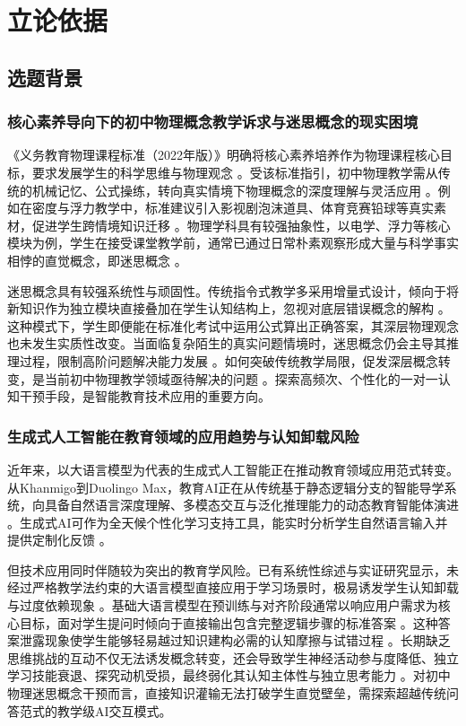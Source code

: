 \chapter{立论依据}
\label{chap:rationale}

\section{选题背景}

\subsection{核心素养导向下的初中物理概念教学诉求与迷思概念的现实困境}

《义务教育物理课程标准（2022年版）》明确将核心素养培养作为物理课程核心目标，要求发展学生的科学思维与物理观念 \citep{ref1}。受该标准指引，初中物理教学需从传统的机械记忆、公式操练，转向真实情境下物理概念的深度理解与灵活应用 \citep{ref3}。例如在密度与浮力教学中，标准建议引入影视剧泡沫道具、体育竞赛铅球等真实素材，促进学生跨情境知识迁移 \citep{ref1}。物理学科具有较强抽象性，以电学、浮力等核心模块为例，学生在接受课堂教学前，通常已通过日常朴素观察形成大量与科学事实相悖的直觉概念，即迷思概念 \citep{ref4}。

迷思概念具有较强系统性与顽固性。传统指令式教学多采用增量式设计，倾向于将新知识作为独立模块直接叠加在学生认知结构上，忽视对底层错误概念的解构 \citep{ref6}。这种模式下，学生即便能在标准化考试中运用公式算出正确答案，其深层物理观念也未发生实质性改变。当面临复杂陌生的真实问题情境时，迷思概念仍会主导其推理过程，限制高阶问题解决能力发展 \citep{ref7}。如何突破传统教学局限，促发深层概念转变，是当前初中物理教学领域亟待解决的问题 \citep{ref5}。探索高频次、个性化的一对一认知干预手段，是智能教育技术应用的重要方向。

\subsection{生成式人工智能在教育领域的应用趋势与认知卸载风险}

近年来，以大语言模型为代表的生成式人工智能正在推动教育领域应用范式转变。从Khanmigo到Duolingo Max，教育AI正在从传统基于静态逻辑分支的智能导学系统，向具备自然语言深度理解、多模态交互与泛化推理能力的动态教育智能体演进 \citep{ref10}。生成式AI可作为全天候个性化学习支持工具，能实时分析学生自然语言输入并提供定制化反馈 \citep{ref12}。

但技术应用同时伴随较为突出的教育学风险。已有系统性综述与实证研究显示，未经过严格教学法约束的大语言模型直接应用于学习场景时，极易诱发学生认知卸载与过度依赖现象 \citep{ref13}。基础大语言模型在预训练与对齐阶段通常以响应用户需求为核心目标，面对学生提问时倾向于直接输出包含完整逻辑步骤的标准答案 \citep{ref16}。这种答案泄露现象使学生能够轻易越过知识建构必需的认知摩擦与试错过程 \citep{ref19}。长期缺乏思维挑战的互动不仅无法诱发概念转变，还会导致学生神经活动参与度降低、独立学习技能衰退、探究动机受损，最终弱化其认知主体性与独立思考能力 \citep{ref14}。对初中物理迷思概念干预而言，直接知识灌输无法打破学生直觉壁垒，需探索超越传统问答范式的教学级AI交互模式。

